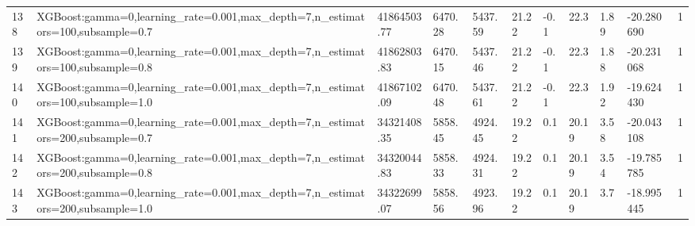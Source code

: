 \begin{longtable}{C{0.8cm} L{2cm} C{1.15cm} C{1.15cm} C{1.15cm} C{1.15cm} C{0.85cm} C{1.25cm} C{1.2cm} C{1.5cm} C{1.0cm}}
138 & XGBoost:\newline gamma=0,\newline learning\_rate=0.001,\newline max\_depth=7,\newline n\_estimators=100,\newline subsample=0.7 & 41864503.77 & 6470.28 & 5437.59 & 21.22 & -0.1 & 22.3 & 1.89 & -20.280690 & 1 \\
139 & XGBoost:\newline gamma=0,\newline learning\_rate=0.001,\newline max\_depth=7,\newline n\_estimators=100,\newline subsample=0.8 & 41862803.83 & 6470.15 & 5437.46 & 21.22 & -0.1 & 22.3 & 1.88 & -20.231068 & 1 \\
140 & XGBoost:\newline gamma=0,\newline learning\_rate=0.001,\newline max\_depth=7,\newline n\_estimators=100,\newline subsample=1.0 & 41867102.09 & 6470.48 & 5437.61 & 21.22 & -0.1 & 22.3 & 1.92 & -19.624430 & 1 \\
141 & XGBoost:\newline gamma=0,\newline learning\_rate=0.001,\newline max\_depth=7,\newline n\_estimators=200,\newline subsample=0.7 & 34321408.35 & 5858.45 & 4924.45 & 19.22 & 0.1 & 20.19 & 3.58 & -20.043108 & 1 \\
142 & XGBoost:\newline gamma=0,\newline learning\_rate=0.001,\newline max\_depth=7,\newline n\_estimators=200,\newline subsample=0.8 & 34320044.83 & 5858.33 & 4924.31 & 19.22 & 0.1 & 20.19 & 3.54 & -19.785785 & 1 \\
143 & XGBoost:\newline gamma=0,\newline learning\_rate=0.001,\newline max\_depth=7,\newline n\_estimators=200,\newline subsample=1.0 & 34322699.07 & 5858.56 & 4923.96 & 19.22 & 0.1 & 20.19 & 3.7 & -18.995445 & 1 \\

\end{longtable}
